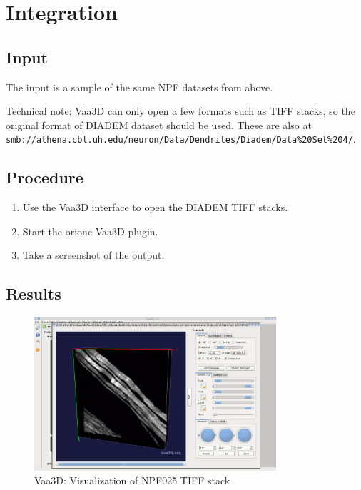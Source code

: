 \documentclass[12pt]{article}
\newcommand{\todofig}[1]{%
	\textcolor{red}{TODO figure: \nolinkurl{#1}}%
}
\begin{document}
\section{Integration}

\subsection{Input}

The input is a sample of the same NPF datasets from above.

Technical note: Vaa3D can only open a few formats such as TIFF stacks, so the
original format of DIADEM dataset should be used. These are also at
\nolinkurl{smb://athena.cbl.uh.edu/neuron/Data/Dendrites/Diadem/Data\%20Set\%204/}.

\subsection{Procedure}

\begin{enumerate}
	\item Use the Vaa3D interface to open the DIADEM TIFF stacks.
	\item Start the \gls{orionc} Vaa3D plugin.
	\item Take a screenshot of the output.
\end{enumerate}

\subsection{Results}

\begin{figure}[H]
\centering
\includegraphics[width=0.8\textwidth]{gfx/vaa3d_DIADEM-NPF-3-025_3D-view}
\caption{Vaa3D: Visualization of NPF025 TIFF stack}
\end{figure}
\end{document}

